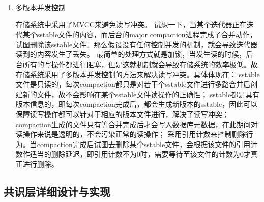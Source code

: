 \begin{enumerate}
		\item 多版本并发控制

存储系统中采用了MVCC来避免读写冲突。
试想一下，当某个迭代器正在迭代某个sstable文件的内容，而后台的major compaction进程完成了合并动作，试图删除该sstable文件。那么假设没有任何控制并发的机制，就会导致迭代器读到的内容发生了丢失。
最简单的处理方式就是加锁，当发生读的时候，后台所有的写操作都进行阻塞，但是这就机制就会导致存储系统的效率极低。故存储系统采用了多版本并发控制的方法来解决读写冲突。具体体现在：
sstable文件是只读的，每次compaction都只是对若干个sstable文件进行多路合并后创建新的文件，故不会影响在某个sstable文件读操作的正确性；
sstable都是具有版本信息的，即每次compaction完成后，都会生成新版本的sstable，因此可以保障读写操作都可以针对于相应的版本文件进行，解决了读写冲突；
compaction生成的文件只有等合并完成后才会写入数据库元数据，在此期间对读操作来说是透明的，不会污染正常的读操作；
采用引用计数来控制删除行为。当compaction完成后试图去删除某个sstable文件，会根据该文件的引用计数作适当的删除延迟，即引用计数不为0时，需要等待至该文件的计数为0才真正进行删除。

\end{enumerate}


\subsection{共识层详细设计与实现}

